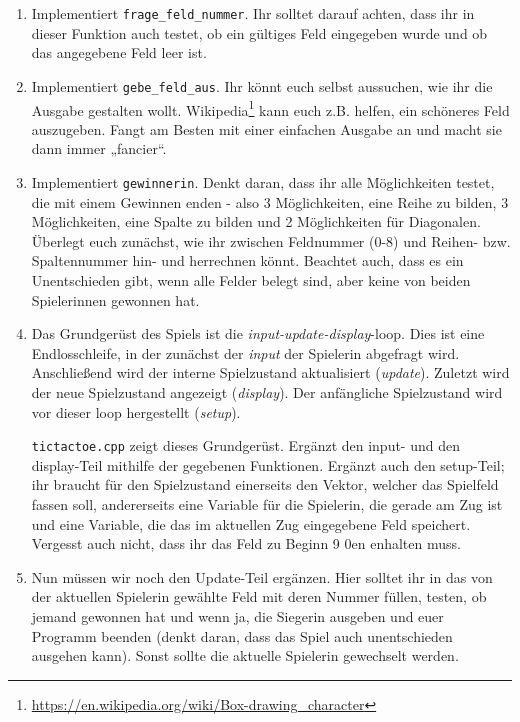 \begin{praxis}
	\begin{enumerate}
    \item Implementiert \texttt{frage\_feld\_nummer}. Ihr solltet darauf
          achten, dass ihr in dieser Funktion auch testet, ob ein gültiges
          Feld eingegeben wurde und ob das angegebene Feld leer ist.

    \item Implementiert \texttt{gebe\_feld\_aus}. Ihr könnt euch selbst
          aussuchen, wie ihr die Ausgabe gestalten wollt.
          Wikipedia\footnote{\url{https://en.wikipedia.org/wiki/Box-drawing_character}}
          kann euch z.B. helfen, ein schöneres Feld auszugeben. Fangt am Besten
          mit einer einfachen Ausgabe an und macht sie dann immer „fancier“.

    \item Implementiert \texttt{gewinnerin}. Denkt daran, dass ihr alle
          Möglichkeiten testet, die mit einem Gewinnen enden - also 3
          Möglichkeiten, eine Reihe zu bilden, 3 Möglichkeiten, eine Spalte zu
          bilden und 2 Möglichkeiten für Diagonalen. Überlegt euch zunächst, wie
          ihr zwischen Feldnummer (0-8) und Reihen- bzw. Spaltennummer hin- und
          herrechnen könnt. Beachtet auch, dass es ein Unentschieden gibt, wenn
          alle Felder belegt sind, aber keine von beiden Spielerinnen gewonnen
          hat.
    \item
		      Das Grundgerüst des Spiels ist die \emph{input-update-display}-loop.
		      Dies ist eine Endlosschleife, in der zunächst der \emph{input} der Spielerin abgefragt wird.
		      Anschließend wird der interne Spielzustand aktualisiert (\emph{update}).
		      Zuletzt wird der neue Spielzustand angezeigt (\emph{display}).
		      Der anfängliche Spielzustand wird vor dieser loop hergestellt (\emph{setup}).

		      \texttt{tictactoe.cpp} zeigt dieses Grundgerüst.
		      Ergänzt den input- und den display-Teil mithilfe der gegebenen Funktionen.
		      Ergänzt auch den setup-Teil; ihr braucht für den Spielzustand einerseits den Vektor, welcher das Spielfeld fassen soll, andererseits eine Variable für die Spielerin, die gerade am Zug ist und eine Variable, die das im aktuellen Zug eingegebene Feld speichert.
		      Vergesst auch nicht, dass ihr das Feld zu Beginn 9 0en enhalten muss.
		\item
		      Nun müssen wir noch den Update-Teil ergänzen.
		      Hier solltet ihr in das von der aktuellen Spielerin gewählte Feld mit deren Nummer füllen, testen, ob jemand gewonnen hat und wenn ja, die Siegerin ausgeben und euer Programm beenden (denkt daran, dass das Spiel auch unentschieden ausgehen kann).
		      Sonst sollte die aktuelle Spielerin gewechselt werden.
	\end{enumerate}
\end{praxis}

